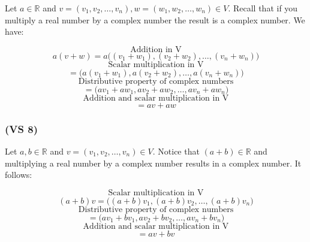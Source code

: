 \documentclass{article}
\begin{document}
Let \(a \in \mathbb{R}\) and \(v = (v_{1}, v_{2}, \dots, v_{n}), w = (w_{1}, w_{2}, \dots, w_{n}) \in V\). 
Recall that if you multiply a real number by a complex number the result is a complex number. We have:

\begin{equation*}
    \text{Addition in V}
\end{equation*}
\begin{equation*}
    a(v + w) = a\Big((v_{1} + w_{1}), (v_{2} + w_{2}), \dots, (v_{n} + w_{n})\Big)
\end{equation*}
\begin{equation*}
    \text{Scalar multiplication in V}
\end{equation*}
\begin{equation*}
    = \Big(a(v_{1} + w_{1}), a(v_{2} + w_{2}), \dots, a(v_{n} + w_{n})\Big)
\end{equation*}
\begin{equation*}
    \text{Distributive property of complex numbers}
\end{equation*}
\begin{equation*}
    = \Big(av_{1} + aw_{1}, av_{2} + aw_{2}, \dots, av_{n} + aw_{n}\Big)
\end{equation*}
\begin{equation*}
    \text{Addition and scalar multiplication in V}
\end{equation*}
\begin{equation*}
    = av + aw
\end{equation*} 


\subsubsection*{(VS 8)}
Let \(a, b \in \mathbb{R}\) and \(v = (v_{1}, v_{2}, \dots, v_{n}) \in V\). Notice that \((a + b) \in \mathbb{R}\)
and multiplying a real number by a complex number results in a complex number. It follows:

\begin{equation*}
    \text{Scalar multiplication in V}
\end{equation*}
\begin{equation*}
    (a + b)v = \Big((a + b)v_{1}, (a + b)v_{2}, \dots, (a + b)v_{n} \Big)
\end{equation*}
\begin{equation*}
    \text{Distributive property of complex numbers}
\end{equation*}
\begin{equation*}
    = \Big(av_{1} + bv_{1}, av_{2} + bv_{2}, \dots, av_{n} + bv_{n} \Big)
\end{equation*}
\begin{equation*}
    \text{Addition and scalar multiplication in V}
\end{equation*}
\begin{equation*}
    = av + bv
\end{equation*}
\end{document}
